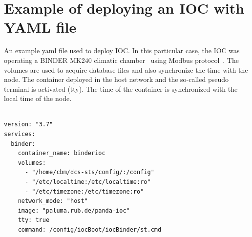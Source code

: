 \newpage
\appendix

\chapter{Example of deploying an IOC with YAML file}
An example yaml file used to deploy \gls{IOC}. In this particular case, the IOC was operating a BINDER MK240 climatic chamber~\cite{binder} using Modbus protocol~\cite{modbus}. The volumes are used to acquire database files and also synchronize the time with the node. The container deployed in the host network and the so-called pseudo terminal is activated (tty). The time of the container is synchronized with the local time of the node. 
\label{YAML}
\begin{verbatim}

version: "3.7"
services:
  binder:
    container_name: binderioc
    volumes:
      - "/home/cbm/dcs-sts/config/:/config"
      - "/etc/localtime:/etc/localtime:ro"
      - "/etc/timezone:/etc/timezone:ro"
    network_mode: "host"
    image: "paluma.rub.de/panda-ioc"
    tty: true
    command: /config/iocBoot/iocBinder/st.cmd
\end{verbatim}

